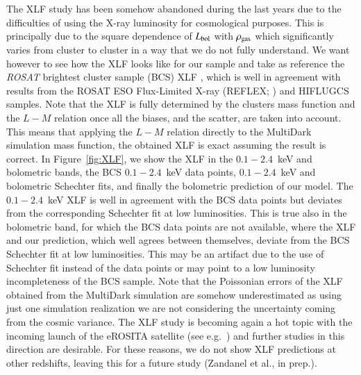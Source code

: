 \documentclass[traditabstract]{aa}
\begin{document}
The XLF study has been somehow abandoned during the last years due to the difficulties of using the X-ray luminosity for cosmological purposes. This is principally due to the square dependence of $L_{\rm{bol}}$ with $\rho_{\rm{gas}}$ which significantly varies from cluster to cluster in a way that we do not fully understand. We want however to see how the XLF looks like for our sample and take as reference the \emph{ROSAT} brightest cluster sample (BCS) XLF \citep{1997ApJ...479L.101E}, which is well in agreement with results from the ROSAT ESO Flux-Limited X-ray (REFLEX; \citealp{2002ApJ...566...93B}) and HIFLUGCS \citep{2002ApJ...567..716R} samples. Note that the XLF is fully determined by the clusters mass function and the $L-M$ relation once all the biases, and the scatter, are taken into account. This means that applying the \cite{2010MNRAS.406.1773M} $L-M$ relation directly to the MultiDark simulation mass function, the obtained XLF is exact assuming the \cite{2010MNRAS.406.1773M} result is correct.
In Figure~\ref{fig:XLF}, we show the \cite{2010MNRAS.406.1773M} XLF in the $0.1-2.4$~keV and bolometric bands, the BCS $0.1-2.4$~keV data points, $0.1-2.4$~keV and bolometric Schechter fits, and finally the bolometric prediction of our model. The $0.1-2.4$~keV \cite{2010MNRAS.406.1773M} XLF is well in agreement with the BCS data points but deviates from the corresponding Schechter fit at low luminosities. This is true also in the bolometric band, for which the BCS data points are not available, where the \cite{2010MNRAS.406.1773M} XLF and our prediction, which well agrees between themselves, deviate from the BCS Schechter fit at low luminosities. This may be an artifact due to the use of Schechter fit instead of the data points or may point to a low luminosity incompleteness of the BCS sample. Note that the Poissonian errors of the XLF obtained from the MultiDark simulation are somehow underestimated as using just one simulation realization we are not considering the uncertainty coming from the cosmic variance. The XLF study is becoming again a hot topic with the incoming launch of the eROSITA satellite (see e.g.~\citealp{2011MSAIS..17..159C}) and further studies in this direction are desirable. For these reasons, we do not show XLF predictions at other redshifts, leaving this for a future study (Zandanel et al., in prep.). 
\end{document}
